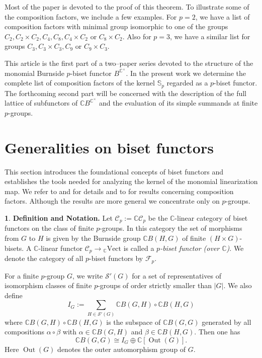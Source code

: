 \documentclass[12pt]{article}
\theoremstyle{plain}
\theoremstyle{definition}
\newtheorem{nothing}[theorem]{}
\newcommand{\out}{\operatorname{Out}}
\begin{document}
Most of the paper is devoted to the proof of this theorem. To illustrate some of the composition factors, we include a few examples. For $p=2$, we have a list of composition factors with minimal group isomorphic to one of the groups $C_2, C_2\times C_2, C_4, C_8, C_4\times C_2$ or $C_8\times C_2$. Also for $p=3$, we have a similar list for groups $C_3, C_3\times C_3, C_9$ or $C_9\times C_3$.


This article is the first part of a two–paper series devoted to the structure of the monomial Burnside $p$-biset functor $B^{\mathbb{C}^\times}$. In the present work we determine the complete list of composition factors of the kernel $\mathbb S_p$ regarded as a $p$-biset functor. The forthcoming second part will be concerned with the description of the full lattice of subfunctors of $\mathbb CB^{\mathbb C^\times}$ and the evaluation of its simple summands at finite $p$-groups. 
    

\section{Generalities on biset functors}\label{sec:pre}

This section introduces the foundational concepts of biset functors and establishes the tools needed for analyzing the kernel of the monomial linearization map. We refer to \cite{Bouc} and \cite{Bouc2} for details and to \cite{BCK} for results concerning composition factors. Although the results are more general we concentrate only on $p$-groups. 

\begin{nothing}{\bf Definition and Notation.}
    Let $\mathcal C_p:=\mathbb C\mathcal C_p$ be the $\mathbb C$-linear category of biset functors on the class of finite $p$-groups. In this category the set of morphisms from $G$ to $H$ is given by the Burnside group $\mathbb C B(H,G)$ of finite $(H\times G)$-bisets. A $\mathbb C$-linear functor $\mathcal C_p\to {}_\mathbb C\text{Vect}$ is called a \textit{$p$-biset functor (over $\mathbb C$)}. We denote the category of all $p$-biset functors by $\mathcal F_p$.

    For a finite $p$-group $G$, we write $\mathcal S'(G)$ for a set of representatives of isomorphism classes of finite $p$-groups of order strictly smaller than $|G|$. We also define 
    \[
    I_G:= \sum_{H\in\mathcal{S}'(G)} \mathbb CB(G,H)\circ \mathbb CB(H,G) 
    \]
    where $\mathbb CB(G,H)\circ \mathbb CB(H,G)$ is the subspace of $\mathbb CB(G, G)$ generated by all compositions $\alpha\circ\beta$ with $\alpha\in\mathbb CB(G,H)$ and $\beta\in\mathbb CB(H,G)$. Then one has
    \[
    \mathbb CB(G, G) \cong I_G \oplus \mathbb C[\out(G)].
    \]
    Here $\out(G)$ denotes the outer automorphism group of $G$. 
\end{nothing}
\end{document}
